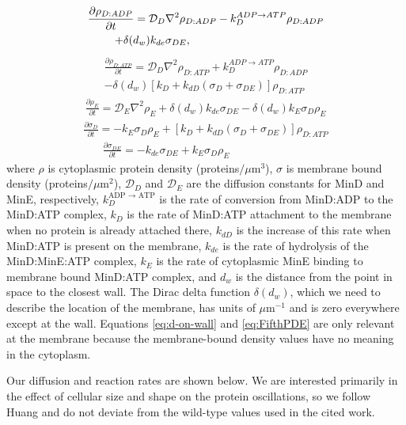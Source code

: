 \documentclass[letterpaper,twocolumn,amsmath,amssymb,pre]{revtex4-1}
\newcommand\micron{\ensuremath{\mu\text{m}}}
\begin{document}
\begin{multline}
  \frac{\partial \rho_{D:ADP}}{\partial t} = \mathcal{D}_D\nabla^2\rho_{D:ADP}-k_D^{ADP\rightarrow ATP}\rho_{D:ADP}\\
  +\delta(d_w)k_{de}\sigma_{DE},\hspace{3.4cm}
\end{multline}
\begin{multline}
  \frac{\partial \rho_{D:ATP}}{\partial t} = \mathcal{D}_D\nabla^2\rho_{D:ATP}+k_D^{ADP\rightarrow ATP}\rho_{D:ADP}\\
  -\delta(d_w)[k_D+k_{dD}(\sigma_D+\sigma_{DE})]\rho_{D:ATP}
\end{multline}
\begin{multline}
  \frac{\partial \rho_E}{\partial t} = \mathcal{D}_E\nabla^2\rho_E+\delta(d_w)k_{de}\sigma_{DE}
  -\delta(d_w)k_E \sigma_D \rho_E
\end{multline}
\begin{multline}
  \frac{\partial \sigma_D}{\partial t} = -k_E\sigma_D\rho_E
  +[k_D+k_{dD}(\sigma_D+\sigma_{DE})]\rho_{D:ATP}
  \label{eq:d-on-wall}
\end{multline}
\begin{multline}
  \frac{\partial \sigma_{DE}}{\partial t} = -k_{de}\sigma_{DE}+k_E\sigma_D\rho_E\hspace{3cm}
  \label{eq:FifthPDE}
\end{multline}
where $\rho$ is cytoplasmic protein density (proteins$/\micron^{3}$), $\sigma$
is membrane bound density (proteins$/\micron^{2}$), $\mathcal{D}_D$ and
$\mathcal{D}_{E}$ are the diffusion constants for MinD and MinE,
respectively, $k_D^{\textrm{ADP $\rightarrow$ ATP}}$ is the rate of
conversion from MinD:ADP to the MinD:ATP complex, $k_D$ is the rate of
MinD:ATP attachment to the membrane when no protein is already
attached there, $k_{dD}$ is the increase of this rate when MinD:ATP is
present on the membrane, $k_{de}$ is the rate of hydrolysis of the
MinD:MinE:ATP complex, $k_E$ is the rate of cytoplasmic MinE binding
to membrane bound MinD:ATP complex, and $d_w$ is the distance from the
point in space to the closest wall.  The Dirac delta function
$\delta(d_w)$, which we need to describe the location of the membrane,
has units of $\micron^{-1}$ and is zero everywhere except at the wall.
Equations \ref{eq:d-on-wall} and \ref{eq:FifthPDE} are only relevant
at the membrane because the membrane-bound density values have no
meaning in the cytoplasm.

Our diffusion and reaction rates are shown below.  We are interested
primarily in the effect of cellular size and shape on the protein
oscillations, so we follow Huang\cite{huang2003dynamic} and do not
deviate from the wild-type values used in the cited work.
\end{document}
